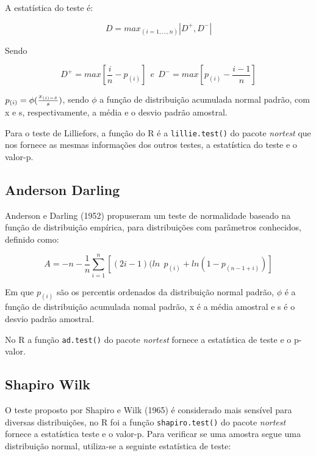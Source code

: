 \documentclass[a4paper,11pt]{article} %
\begin{document}
A estatística do teste é:

\begin{equation}
   D = max_{(i=1,...,n)}|D^{+},D^{-}|
\end{equation}

Sendo

\begin{equation}
    D^{+} = max{\left[\frac{i}{n} - p_{(i)}\right]} \ \ e \ \ D^{-} = max{\left[p_{(i)} - \frac{i-1}{n}\right]}
\end{equation}


$ p_{(i)}= \phi( \frac{x_{(i)-\Bar{x}}}{s} )$, sendo $\phi$ a função de distribuição acumulada normal padrão, com x e s, respectivamente, a média e o desvio padrão amostral.\vskip0.3cm

Para o teste de Lilliefors, a função do R é a \texttt{lillie.test()} do pacote \textit{nortest} que nos fornece as mesmas informações dos outros testes, a estatística do teste e o valor-p.\vskip0.3cm

\subsection{Anderson Darling}

Anderson e Darling (1952) propuseram um teste de normalidade baseado na função de distribuição empírica, para distribuições com parâmetros conhecidos, definido como: 

\begin{equation}
    A = -n - \frac{1}{n} \sum_{i=1}^{n} [(2i-1)(ln \ \ p_{(i)} + ln(1- p_{(n-1+i)})]
\end{equation}

Em que $p_{(i)}$ são os percentis ordenados da distribuição normal padrão, $\phi$ é a função de distribuição acumulada nomal padrão, x é a média amostral e s é o desvio padrão amostral.\vskip0.3cm

No R a função \texttt{ad.test()} do pacote \textit{nortest} fornece a estatística de teste e o p-valor. \vskip0.3cm

\subsection{Shapiro Wilk}

O teste proposto por Shapiro e Wilk (1965) é considerado mais sensível para diversas distribuições, no R foi a função \texttt{shapiro.test()} do pacote \textit{nortest} fornece a estatística teste e o valor-p. Para verificar se uma amostra segue uma distribuição normal, utiliza-se a seguinte estatística de teste: 
\end{document}
